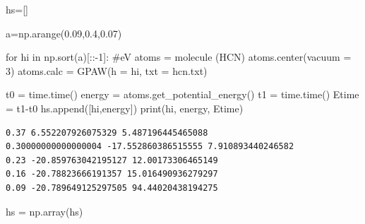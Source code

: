 \documentclass[
  letterpaper,
  DIV=11,
  numbers=noendperiod]{scrreprt}
\newenvironment{Shaded}{\begin{snugshade}}{\end{snugshade}}
\newcommand{\BuiltInTok}[1]{\textcolor[rgb]{0.00,0.23,0.31}{#1}}
\newcommand{\CommentTok}[1]{\textcolor[rgb]{0.37,0.37,0.37}{#1}}
\newcommand{\ControlFlowTok}[1]{\textcolor[rgb]{0.00,0.23,0.31}{#1}}
\newcommand{\DecValTok}[1]{\textcolor[rgb]{0.68,0.00,0.00}{#1}}
\newcommand{\FloatTok}[1]{\textcolor[rgb]{0.68,0.00,0.00}{#1}}
\newcommand{\KeywordTok}[1]{\textcolor[rgb]{0.00,0.23,0.31}{#1}}
\newcommand{\NormalTok}[1]{\textcolor[rgb]{0.00,0.23,0.31}{#1}}
\newcommand{\OperatorTok}[1]{\textcolor[rgb]{0.37,0.37,0.37}{#1}}
\newcommand{\StringTok}[1]{\textcolor[rgb]{0.13,0.47,0.30}{#1}}
\begin{document}
\begin{Shaded}
\begin{Highlighting}[]
\NormalTok{hs}\OperatorTok{=}\NormalTok{[]}

\NormalTok{a}\OperatorTok{=}\NormalTok{np.arange(}\FloatTok{0.09}\NormalTok{,}\FloatTok{0.4}\NormalTok{,}\FloatTok{0.07}\NormalTok{)}

\ControlFlowTok{for}\NormalTok{ hi }\KeywordTok{in}\NormalTok{ np.sort(a)[::}\OperatorTok{{-}}\DecValTok{1}\NormalTok{]: }\CommentTok{\#eV}
\NormalTok{    atoms }\OperatorTok{=}\NormalTok{ molecule (}\StringTok{\textquotesingle{}HCN\textquotesingle{}}\NormalTok{)}
\NormalTok{    atoms.center(vacuum }\OperatorTok{=} \DecValTok{3}\NormalTok{)}
\NormalTok{    atoms.calc }\OperatorTok{=}\NormalTok{ GPAW(h }\OperatorTok{=}\NormalTok{ hi, txt }\OperatorTok{=} \StringTok{\textquotesingle{}hcn.txt\textquotesingle{}}\NormalTok{)}

\NormalTok{    t0 }\OperatorTok{=}\NormalTok{ time.time()}
\NormalTok{    energy }\OperatorTok{=}\NormalTok{ atoms.get\_potential\_energy()}
\NormalTok{    t1 }\OperatorTok{=}\NormalTok{ time.time()}
\NormalTok{    Etime }\OperatorTok{=}\NormalTok{ t1}\OperatorTok{{-}}\NormalTok{t0}
\NormalTok{    hs.append([hi,energy])}
    \BuiltInTok{print}\NormalTok{(hi, energy, Etime)}
\end{Highlighting}
\end{Shaded}

\begin{verbatim}
0.37 6.552207926075329 5.487196445465088
0.30000000000000004 -17.552860386515555 7.910893440246582
0.23 -20.859763042195127 12.00173306465149
0.16 -20.78823666191357 15.016490936279297
0.09 -20.789649125297505 94.44020438194275
\end{verbatim}

\begin{Shaded}
\begin{Highlighting}[]
\NormalTok{hs }\OperatorTok{=}\NormalTok{ np.array(hs)}
\end{Highlighting}
\end{Shaded}
\end{document}

